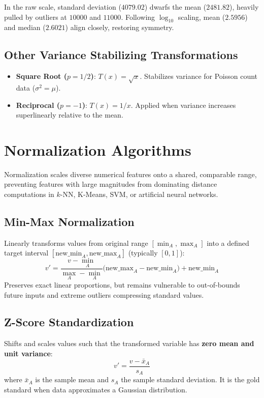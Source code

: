 In the raw scale, standard deviation ($4079.02$) dwarfs the mean ($2481.82$), heavily pulled by outliers at $10000$ and $11000$. Following $\log_{10}$ scaling, mean ($2.5956$) and median ($2.6021$) align closely, restoring symmetry.

\subsection{Other Variance Stabilizing Transformations}
\begin{itemize}[noitemsep]
    \item \textbf{Square Root ($p = 1/2$)}: $T(x) = \sqrt{x}$. Stabilizes variance for Poisson count data ($\sigma^2 = \mu$).
    \item \textbf{Reciprocal ($p = -1$)}: $T(x) = 1/x$. Applied when variance increases superlinearly relative to the mean.
\end{itemize}

\section{Normalization Algorithms}
\label{sec:dm-normalization-algorithms}

Normalization scales diverse numerical features onto a shared, comparable range, preventing features with large magnitudes from dominating distance computations in $k$-NN, K-Means, SVM, or artificial neural networks.

\subsection{Min-Max Normalization}
Linearly transforms values from original range $[\min_A, \max_A]$ into a defined target interval $[\text{new\_min}_A, \text{new\_max}_A]$ (typically $[0, 1]$):
\begin{equation}
    v' = \frac{v - \min_A}{\max_A - \min_A} \big(\text{new\_max}_A - \text{new\_min}_A\big) + \text{new\_min}_A
\end{equation}
Preserves exact linear proportions, but remains vulnerable to out-of-bounds future inputs and extreme outliers compressing standard values.

\subsection{Z-Score Standardization}
Shifts and scales values such that the transformed variable has \textbf{zero mean and unit variance}:
\begin{equation}
    v' = \frac{v - \bar{x}_A}{s_A}
\end{equation}
where $\bar{x}_A$ is the sample mean and $s_A$ the sample standard deviation. It is the gold standard when data approximates a Gaussian distribution.

